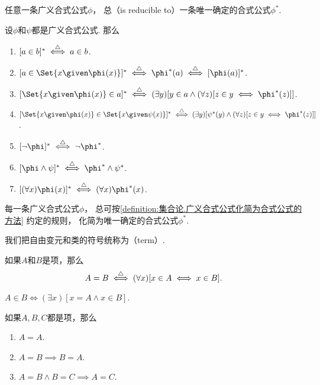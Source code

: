 任意一条广义合式公式\(\phi\)，
总（is reducible to）一条唯一确定的合式公式\(\phi^*\).
\begin{definition}\label{definition:集合论.广义合式公式化简为合式公式的方法}
设\(\phi\)和\(\psi\)都是广义合式公式.
\def\A{\Set{ x \given \phi(x) }}
\def\B{\Set{ x \given \psi(x) }}
那么\begin{enumerate}
	\item \([a \in b]^* \overset{\triangle}{\iff} a \in b\).
	\item \([a \in \A]^* \defiff \phi^*(a) \defiff [\phi(a)]^*\).
	\item \([\A \in a]^* \defiff (\exists y)[y \in a \land (\forall z)[z \in y \iff \phi^*(z)]]\).
	\item \([\A \in \B]^* \defiff (\exists y)[\psi^*(y) \land (\forall z)[z \in y \iff \phi^*(z)]]\).
	\item \([\neg\phi]^* \defiff \neg\phi^*\).
	\item \([\phi\land\psi]^* \defiff \phi^*\land\psi^*\).
	\item \([(\forall x)\phi(x)]^* \defiff (\forall x)\phi^*(x)\).
\end{enumerate}
\end{definition}

\begin{theorem}
每一条广义合式公式\(\phi\)，
总可按\cref{definition:集合论.广义合式公式化简为合式公式的方法} 约定的规则，
化简为唯一确定的合式公式\(\phi^*\).
\end{theorem}

我们把自由变元和类的符号统称为（term）.
\begin{definition}
如果\(A\)和\(B\)是项，那么\begin{equation*}
	A=B \overset{\triangle}{\iff} (\forall x)[x \in A \iff x \in B].
\end{equation*}
\end{definition}

\begin{theorem}
\(A \in B \iff (\exists x)[x = A \land x \in B]\).
\end{theorem}

\begin{theorem}
如果\(A,B,C\)都是项，那么\begin{enumerate}
	\item \(A=A\).
	\item \(A=B \implies B=A\).
	\item \(A=B \land B=C \implies A=C\).
\end{enumerate}
\end{theorem}

